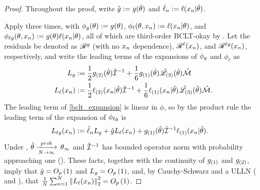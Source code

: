 \begin{proof}
%
Throughout the proof, write $\hat{g} := g(\hat\theta)$ and $\hat\ell_n :=
\ell(x_n \vert \hat\theta)$.

Apply  three times, with $\phi_g(\theta) :=
g(\theta)$, $\phi_\ell(\theta, x_n) := \ell(x_n \vert \theta)$, and
$\phi_{\ell g}(\theta, x_n) := g(\theta) \ell(x_n \vert \theta)$, all of
which are third-order BCLT-okay by . Let the residuals be
denoted as $\mathscr{R}^{g}$ (with no $x_n$ dependence), $\mathscr{R}^{\ell}(x_n)$, and
$\mathscr{R}^{\ell g}(x_n)$, respectively, and write the leading terms of the
expansions of $\phi_g$ and $\phi_\ell$ as
%
\begin{align*}
%
L_\g :={}&
\frac{1}{2} \ggrad{2}(\thetahat) \infohat^{-1} +
\frac{1}{6} \ggrad{1}(\thetahat) \likhatk{3}(\thetahat) \normfourth
\\
L_\ell(\x_n) :={}&
\frac{1}{2} \ellgrad{2}(\x_n \vert \thetahat) \infohat^{-1} +
\frac{1}{6} \ellgrad{1}(\x_n \vert \thetahat) \likhatk{3}(\thetahat) \normfourth.
%
\end{align*}
%
The leading term of \eqref{bclt_expansion} is linear in $\phi$, so by the
product rule the leading term of the expansion of $\phi_{\ell g}$ is
%
\begin{align*}
%
L_{\ell\g}(\x_n) :={}&
\hat\ell_n L_\g + \hat\g L_\ell(\x_n) +
\ggrad{1}(\thetahat) \infohat^{-1} \ellgrad{1}(\x_n \vert \thetahat).
%
\end{align*}
%
Under , $\hat\theta \xrightarrow[N\rightarrow\infty]{prob}\, \theta_{\infty}$  and $\hat{\mathcal{I}}^{-1}$ has
bounded operator norm with probability approaching one ().
These facts, together with the continuity of $g_{(1)}$ and $g_{(2)}$,
imply that $\hat{g} = O_p\left(1\right)$ and $L_g = O_p\left(1\right)$, and, by
Cauchy-Schwarz and a ULLN (  and
), that $\frac{1}{N}\sum_{n=1}^N \left\Vert L_\ell(x_n)\right\Vert_2^2 = O_p\left(1\right)$.


\end{proof}
